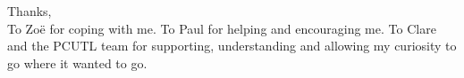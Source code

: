 \documentclass{memoir}
\begin{document}
\begin{vplace}[.7]
\thispagestyle{empty}
Thanks,
\vspace{.5cm}
\\
To Zo\"{e} for coping with me. To Paul for helping and encouraging me. To Clare and the PCUTL team for supporting, understanding and allowing my curiosity to go where it wanted to go.
\end{vplace}
\end{document}
